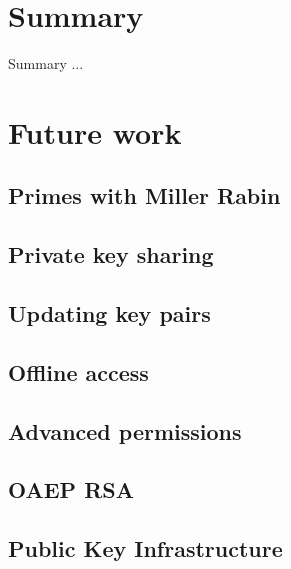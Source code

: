 \chapter{Summary}

Summary ...

\chapter{Future work}

\section{Primes with Miller Rabin}
\section{Private key sharing}
\section{Updating key pairs}
\section{Offline access}
\section{Advanced permissions}
\section{OAEP RSA}
\section{Public Key Infrastructure}
